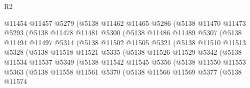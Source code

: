 \begin{lexlean}{R2}
\begin{coremodule}
                      @11454
                      @11457
                      @5279
                      (@5138
                        @11462
                        @11465
                        @5286
                        (@5138
                          @11470
                          @11473
                          @5293
                          (@5138
                            @11478
                            @11481
                            @5300
                            (@5138
                              @11486
                              @11489
                              @5307
                              (@5138
                                @11494
                                @11497
                                @5314
                                (@5138
                                  @11502
                                  @11505
                                  @5321
                                  (@5138
                                    @11510
                                    @11513
                                    @5328
                                    (@5138
                                      @11518
                                      @11521
                                      @5335
                                      (@5138
                                        @11526
                                        @11529
                                        @5342
                                        (@5138
                                          @11534
                                          @11537
                                          @5349
                                          (@5138
                                            @11542
                                            @11545
                                            @5356
                                            (@5138
                                              @11550
                                              @11553
                                              @5363
                                              (@5138
                                                @11558
                                                @11561
                                                @5370
                                                (@5138
                                                  @11566
                                                  @11569
                                                  @5377
                                                  (@5138
                                                    @11574

\end{coremodule}
\end{lexlean}
